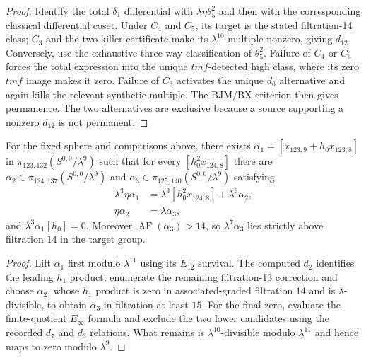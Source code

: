 \begin{proof}
  Identify the total $\delta_1$ differential with
  $\lambda\eta\theta_5^2$ and then with the corresponding classical
  differential coset.  Under $C_4$ and $C_5$, its target is the stated
  filtration-14 class; $C_3$ and the two-killer certificate make its
  $\lambda^{10}$ multiple nonzero, giving $d_{12}$.  Conversely, use the
  exhaustive three-way classification of $\theta_5^2$.  Failure of $C_4$ or
  $C_5$ forces the total expression into the unique $tmf$-detected high class,
  where its zero $tmf$ image makes it zero.  Failure of $C_3$ activates the
  unique $d_6$ alternative and again kills the relevant synthetic multiple.
  The BJM/BX criterion then gives permanence.  The two alternatives are
  exclusive because a source supporting a nonzero $d_{12}$ is not permanent.
\end{proof}

\begin{lemma}
  \label{lem:near126-alpha-relations}
  \notready
  For the fixed sphere and comparisons above, there exists
  $\alpha_1=[x_{123,9}+h_0x_{123,8}]$ in
  $\pi_{123,132}(S^{0,0}/\lambda^9)$ such that for every
  $[h_0^2x_{124,8}]$ there are
  $\alpha_2\in\pi_{124,137}(S^{0,0}/\lambda^9)$ and
  $\alpha_3\in\pi_{125,140}(S^{0,0}/\lambda^9)$ satisfying
  \[
  \begin{aligned}
    \lambda^3\eta\alpha_1
      &=\lambda^3[h_0^2x_{124,8}]+\lambda^6\alpha_2,\\
    \eta\alpha_2&=\lambda\alpha_3,
  \end{aligned}
  \]
  and $\lambda^3\alpha_1[h_0]=0$.  Moreover
  $\operatorname{AF}(\alpha_3)>14$, so
  $\lambda^7\alpha_3$ lies strictly above filtration $14$ in the target
  group.
\end{lemma}

\begin{proof}
  Lift $\alpha_1$ first modulo $\lambda^{11}$ using its $E_{12}$ survival.
  The computed $d_2$ identifies the leading $h_1$ product; enumerate the
  remaining filtration-13 correction and choose $\alpha_2$, whose $h_1$
  product is zero in associated-graded filtration $14$ and is
  $\lambda$-divisible, to obtain $\alpha_3$ in filtration at least $15$.
  For the final zero,
  evaluate the finite-quotient $E_\infty$ formula and exclude the two lower
  candidates using the recorded $d_7$ and $d_3$ relations.  What remains is
  $\lambda^{10}$-divisible modulo $\lambda^{11}$ and hence maps to zero modulo
  $\lambda^9$.
\end{proof}


